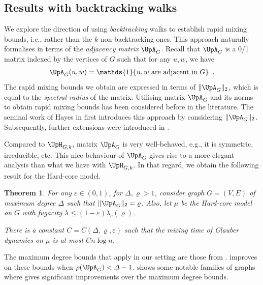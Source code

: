 \documentclass[11pt,reqno]{amsart}
\numberwithin{equation}{section}
\newtheorem{theorem}{Theorem}[section]
\newcommand{\blue}[1]{{\color{blue}#1}}
\newcommand{\bluepigment}[1]{{\color{blue(pigment)}#1}}
\newcommand{\cadmiumgreen}[1]{{\color{cadmiumgreen}#1}}
\newcommand{\goldenbrown}[1]{{\color{goldenbrown}#1}}
\newcommand{\red}[1]{{\color{red}#1}}
\newcommand{\Ind}{\mathds{1}}
\newcommand{\maxDeg}{{\Delta}}
\newcommand{\lcritical}{{\lambda_c}}
\newcommand{\spradius}{{\rho}}
\newcommand{\norm}[2]{\goldenbrown{\|} #1 \goldenbrown{\|}_{#2}}
\newcommand{\Adjacency}{{\UpA}}
\newcommand{\aspradius}{{\varrho}}
\newcommand{\NBMatrix}{\cadmiumgreen{\UpH}_{G,\kk}}
\renewcommand{\blue}[1]{#1}
\renewcommand{\bluepigment}[1]{#1}
\renewcommand{\cadmiumgreen}[1]{#1}
\renewcommand{\goldenbrown}[1]{#1}
\renewcommand{\red}[1]{#1}
\newcommand{\kk}{\bluepigment{k}}
\newcommand{\ku}{\red{u}}
\newcommand{\kw}{\blue{w}}
\renewcommand{\kk}{k}
\renewcommand{\ku}{u}
\renewcommand{\kw}{w}
\begin{document}
\subsection{Results with backtracking walks}

We    explore the direction of using   {\em backtracking} walks to establish rapid mixing bounds, i.e., 
rather than  the  $k$-non-backtracking ones.  This approach naturally formalises in terms of the {\em adjacency matrix}  
$\Adjacency_G$.  
Recall that  $\Adjacency_G$ is a 0/1 matrix indexed by   the vertices of $G$ such that   for any  $\ku,\kw$,  we have 
\begin{align}\nonumber 
\Adjacency_G( \ku,\kw)= \Ind\{\textrm{$\ku, \kw$ are adjacent in $G$}\} \enspace.
\end{align} 
%
The rapid mixing bounds we obtain are  expressed in terms of $\| \Adjacency_G \|_2$, 
which is equal to the {\em spectral radius}  of the matrix.
%
Utilising  matrix $\Adjacency_G$ and its norms to obtain rapid mixing bounds has been considered before in the literature.   The seminal  work 
of Hayes in \cite{Hayes06} first introduces this approach by considering $\|\Adjacency_G\|_2$. Subsequently, further extensions 
were introduced   in \cite{DGJ09,Hayes07}.


 Compared to $\NBMatrix$, matrix $\Adjacency_G$ is very well-behaved, e.g., it is symmetric, irreducible, etc. This nice behaviour of
 $\Adjacency_G$ gives rise to a  more elegant analysis  than what we have with $\NBMatrix$.
In that regard, we obtain the following  result for the Hard-core model.





\begin{theorem}\label{thrm:HC4SPRadiusAdj}
For any $\varepsilon \in (0,1)$, for $\maxDeg, \aspradius>1$, consider graph $G=(V,E)$ 
of maximum degree $\maxDeg$ such that $\norm{ \Adjacency_G}{2}=\aspradius$. 
Also, let $\mu$ be the Hard-core model on $G$ with fugacity $\lambda\leq (1-\varepsilon)\lcritical(\aspradius)$.

There is a constant $C={C(\maxDeg, \aspradius, \varepsilon)}$ such that the mixing time of Glauber dynamics on $\mu$ 
is at most $C n\log n$.
\end{theorem}

The maximum degree bounds that apply in our setting are those from \cite{OptMCMCIS,VigodaSpectralIndB}.
%
  improves on these bounds  when  $\spradius(\Adjacency_G)<\maxDeg-1$. 
 shows  some notable families of graphs where  
 gives significant improvements over the maximum degree bounds. 
%
\end{document}

